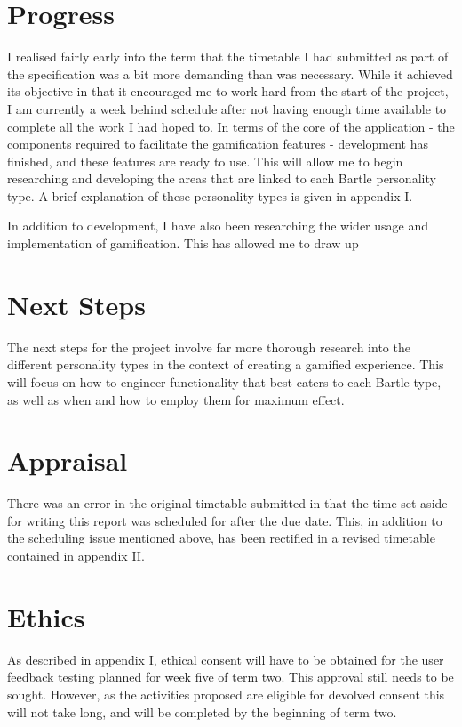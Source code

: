 \documentclass[10pt,a4paper]{report}
\begin{document}
\section*{Progress}
I realised fairly early into the term that the timetable I had submitted as part of the specification was a bit more demanding than was necessary. While it achieved its objective in that it encouraged me to work hard from the start of the project, I am currently a week behind schedule after not having enough time available to complete all the work I had hoped to. In terms of the core of the application - the components required to facilitate the gamification features - development has finished, and these features are ready to use. This will allow me to begin researching and developing the areas that are linked to each Bartle personality type. A brief explanation of these personality types is given in appendix I. 

In addition to development, I have also been researching the wider usage and implementation of gamification. This has allowed me to draw up 

\section*{Next Steps}
The next steps for the project involve far more thorough research into the different personality types in the context of creating a gamified experience. This will focus on how to engineer functionality that best caters to each Bartle type, as well as when and how to employ them for maximum effect. 

\section*{Appraisal}
There was an error in the original timetable submitted in that the time set aside for writing this report was scheduled for after the due date. This, in addition to the scheduling issue mentioned above, has been rectified in a revised timetable contained in appendix II.

\section*{Ethics}
As described in appendix I, ethical consent will have to be obtained for the user feedback testing planned for week five of term two. This approval still needs to be sought. However, as the activities proposed are eligible for devolved consent this will not take long, and will be completed by the beginning of term two.
\end{document}
